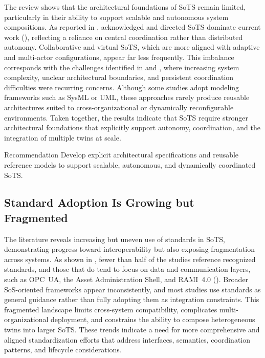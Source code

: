 The review shows that the architectural foundations of SoTS remain limited, particularly in their ability to support scalable and autonomous system compositions. As reported in , acknowledged and directed SoTS dominate current work (), reflecting a reliance on central coordination rather than distributed autonomy. Collaborative and virtual SoTS, which are more aligned with adaptive and multi-actor configurations, appear far less frequently. This imbalance corresponds with the challenges identified in  and , where increasing system complexity, unclear architectural boundaries, and persistent coordination difficulties were recurring concerns. Although some studies adopt modeling frameworks such as SysML or UML, these approaches rarely produce reusable architectures suited to cross-organizational or dynamically reconfigurable environments. Taken together, the results indicate that SoTS require stronger architectural foundations that explicitly support autonomy, coordination, and the integration of multiple twins at scale.

\begin{extrarecoframe}{Recommendation}
Develop explicit architectural specifications and reusable reference models to support scalable, autonomous, and dynamically coordinated SoTS.
\end{extrarecoframe}



\subsection*{Standard Adoption Is Growing but Fragmented}

The literature reveals increasing but uneven use of standards in SoTS, demonstrating progress toward interoperability but also exposing fragmentation across systems. As shown in , fewer than half of the studies reference recognized standards, and those that do tend to focus on data and communication layers, such as OPC~UA, the Asset Administration Shell, and RAMI~4.0 (). Broader SoS-oriented frameworks appear inconsistently, and most studies use standards as general guidance rather than fully adopting them as integration constraints. This fragmented landscape limits cross-system compatibility, complicates multi-organizational deployment, and constrains the ability to compose heterogeneous twins into larger SoTS. These trends indicate a need for more comprehensive and aligned standardization efforts that address interfaces, semantics, coordination patterns, and lifecycle considerations.

